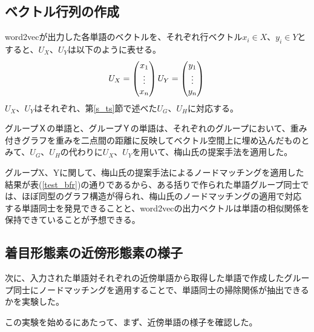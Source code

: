 \subsection{ベクトル行列の作成}
word2vecが出力した各単語のベクトルを、それぞれ行ベクトル$x_i\in X$、$y_i\in Y$とすると、$U_X$、$U_Y$は以下のように表せる。
\begin{equation}
  U_X=\begin{pmatrix}
    x_1 \\
    \vdots \\
    x_n
  \end{pmatrix} \notag \\
  U_Y=\begin{pmatrix}
    y_1 \\
    \vdots \\
    y_n
  \end{pmatrix} \notag \\
\end{equation}
$U_X$、$U_Y$はそれぞれ、第\ref{s_ts}節で述べた$U_G$、$U_H$に対応する。

グループＸの単語と、グループＹの単語は、それぞれのグループにおいて、重み付きグラフを重みを二点間の距離に反映してベクトル空間上に埋め込んだものとみて、$U_G$、$U_H$の代わりに$U_X$、$U_Y$を用いて、梅山氏の提案手法を適用した。

グループX、Yに関して、梅山氏の提案手法によるノードマッチングを適用した結果が表(\ref{test_bfr})の通りであるから、ある括りで作られた単語グループ同士では、ほぼ同型のグラフ構造が得られ、梅山氏のノードマッチングの適用で対応する単語同士を発見できることと、word2vecの出力ベクトルは単語の相似関係を保持できていることが予想できる。

\subsection{着目形態素の近傍形態素の様子}
次に、入力された単語対それぞれの近傍単語から取得した単語で作成したグループ同士にノードマッチングを適用することで、単語同士の掃除関係が抽出できるかを実験した。

この実験を始めるにあたって、まず、近傍単語の様子を確認した。

